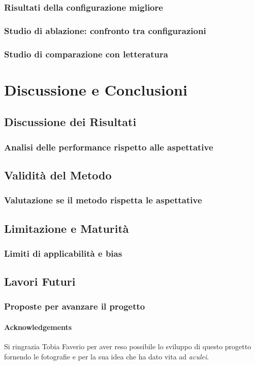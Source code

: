 \documentclass[12pt,a4paper,twoside]{article}
\begin{document}
\subsubsection{Risultati della configurazione migliore}
\subsubsection{Studio di ablazione: confronto tra configurazioni}
\subsubsection{Studio di comparazione con letteratura}


\newpage
\section{Discussione e Conclusioni}

\subsection{Discussione dei Risultati}
\subsubsection{Analisi delle performance rispetto alle aspettative}

\subsection{Validità del Metodo}
\subsubsection{Valutazione se il metodo rispetta le aspettative}

\subsection{Limitazione e Maturità}
\subsubsection{Limiti di applicabilità e bias}

\subsection{Lavori Futuri}
\subsubsection{Proposte per avanzare il progetto}

\paragraph{Acknowledgements} Si ringrazia Tobia Faverio per aver reso possibile lo sviluppo di questo progetto fornendo le fotografie e per la sua idea che ha dato vita ad \textit{aculei}.

\printbibliography
\end{document}
